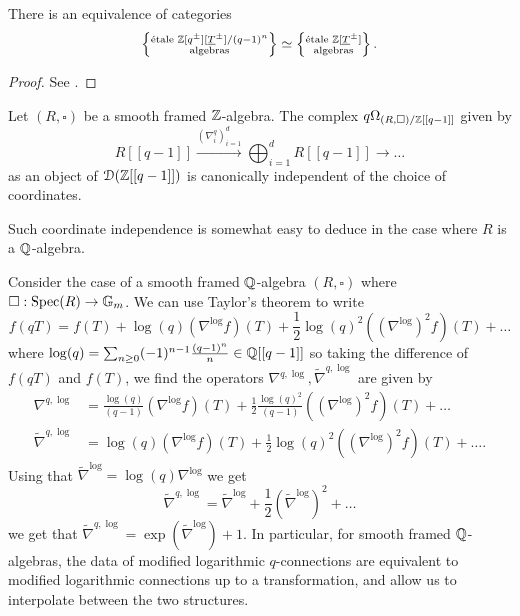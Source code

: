 \begin{lemma}\label{lem: equivalence of categories}
    There is an equivalence of categories 
    $$\left\{\substack{\text{\'{e}tale }\mathbb{Z}[q^{\pm}][\underline{T}^{\pm}]/(q-1)^{n} \\ \text{algebras}}\right\}\simeq\left\{\substack{\text{\'{e}tale }\mathbb{Z}[\underline{T}^{\pm}] \\ \text{algebras}}\right\}.$$
\end{lemma}
\begin{proof}
    See \cite[\href{https://stacks.math.columbia.edu/tag/039R}{Tag 039R}]{stacks-project}. 
\end{proof}
\begin{theorem}
    Let $(R,\square)$ be a smooth framed $\mathbb{Z}$-algebra. The complex $q\Omega_{(R,\square)/\mathbb{Z}[[q-1]]}$ given by 
    $$R[[q-1]]\xrightarrow{(\nabla_{i}^{q})_{i=1}^{d}}\bigoplus_{i=1}^{d}R[[q-1]]\longrightarrow\dots$$
    as an object of $\EuScript{D}(\mathbb{Z}[[q-1]])$ is canonically independent of the choice of coordinates. 
\end{theorem}
Such coordinate independence is somewhat easy to deduce in the case where $R$ is a $\mathbb{Q}$-algebra. 
\begin{example}\label{ex: translation between connections and q-connections}
    Consider the case of a smooth framed $\mathbb{Q}$-algebra $(R,\square)$ where $\square:\operatorname{Spec}(R)\to\mathbb{G}_{m}$. We can use Taylor's theorem to write 
    $$f(qT)=f(T)+\log(q)(\nabla^{\log}f)(T)+\frac{1}{2}\log(q)^{2}((\nabla^{\log})^{2}f)(T)+\dots$$
    where $\log(q)=\sum_{n\geq0}(-1)^{n-1}\frac{(q-1)^{n}}{n}\in\mathbb{Q}[[q-1]]$ so taking the difference of $f(qT)$ and $f(T)$, we find the operators $\nabla^{q,\log},\widetilde{\nabla}^{q,\log}$ are given by 
    \begin{align*}
        \nabla^{q,\log} &= \frac{\log(q)}{(q-1)}(\nabla^{\log}f)(T)+\frac{1}{2}\frac{\log(q)^{2}}{(q-1)}((\nabla^{\log})^{2}f)(T)+\dots\\
        \widetilde{\nabla}^{q,\log} &= \log(q)(\nabla^{\log}f)(T)+\frac{1}{2}\log(q)^{2}((\nabla^{\log})^{2}f)(T)+\dots.
    \end{align*}
    Using that $\widetilde{\nabla}^{\log}=\log(q)\nabla^{\log}$ we get 
    $$\widetilde{\nabla}^{q,\log}=\widetilde{\nabla}^{\log}+\frac{1}{2}(\widetilde{\nabla}^{\log})^{2}+\dots$$
    we get that $\widetilde{\nabla}^{q,\log}=\exp(\widetilde{\nabla}^{\log})+1$. In particular, for smooth framed $\mathbb{Q}$-algebras, the data of modified logarithmic $q$-connections are equivalent to modified logarithmic connections up to a transformation, and allow us to interpolate between the two structures. 
\end{example}
